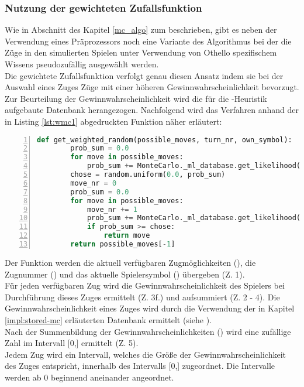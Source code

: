 \subsubsection{Nutzung der gewichteten Zufallsfunktion}
\authorpatrick
Wie in Abschnitt  des Kapitel \ref{mc_algo} zum  beschrieben, gibt es neben der Verwendung eines Präprozessors noch eine  Variante des Algorithmus bei der die Züge in den simulierten Spielen unter Verwendung von Othello spezifischem Wissens pseudozufällig ausgewählt werden. 
\\Die gewichtete Zufallsfunktion verfolgt genau diesen Ansatz indem sie bei der Auswahl eines Zuges Züge mit einer höheren Gewinnwahrscheinlichkeit bevorzugt. Zur Beurteilung der Gewinnwahrscheinlichkeit wird die für die -Heuristik aufgebaute Datenbank herangezogen. Nachfolgend wird das Verfahren anhand der in Listing \ref{lst:wmc1} abgedruckten Funktion näher erläutert:
\begin{lstlisting}[basicstyle=\footnotesize, caption = {get\_weighted\_random Funktion des Monte-Carlo Agenten}, language = python, captionpos = t , numbers=left, label={lst:wmc1}]
    def get_weighted_random(possible_moves, turn_nr, own_symbol):
        prob_sum = 0.0
        for move in possible_moves:
            prob_sum += MonteCarlo._ml_database.get_likelihood(move,turn_nr,own_symbol)
        chose = random.uniform(0.0, prob_sum)
        move_nr = 0
        prob_sum = 0.0
        for move in possible_moves:
            move_nr += 1
            prob_sum += MonteCarlo._ml_database.get_likelihood(move,turn_nr,own_symbol)
            if prob_sum >= chose:
                return move
        return possible_moves[-1]
\end{lstlisting}
Der Funktion werden die aktuell verfügbaren Zugmöglichkeiten (), die Zugnummer () und das aktuelle Spielersymbol () übergeben (Z. 1).
\\Für jeden verfügbaren Zug wird die Gewinnwahrscheinlichkeit des Spielers bei Durchführung dieses Zuges ermittelt (Z. 3f.) und aufsummiert (Z. 2 - 4). Die Gewinnwahrscheinlichkeit eines Zuges wird durch die Verwendung der in Kapitel \ref{impl:stored-mc} erläuterten Datenbank ermittelt (siehe ).
\\Nach der Summenbildung der Gewinnwahrscheinlichkeiten () wird eine zufällige Zahl im Intervall [0,] ermittelt (Z. 5).
\\Jedem Zug wird ein Intervall, welches die Größe der Gewinnwahrscheinlichkeit des Zuges entspricht, innerhalb des Intervalls [0,] zugeordnet. Die Intervalle werden ab 0 beginnend aneinander angeordnet. 

